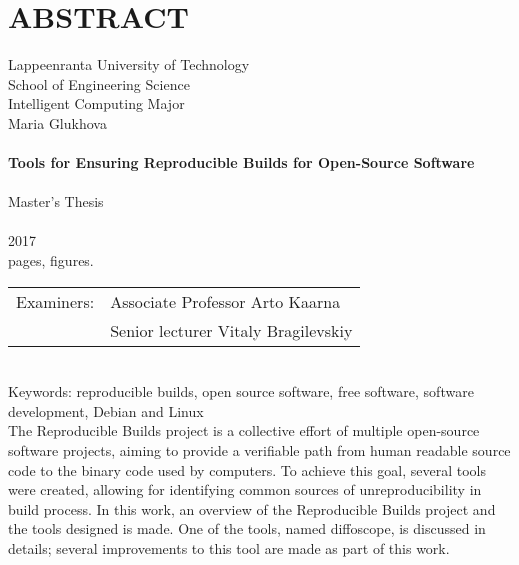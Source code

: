 \section*{ABSTRACT}

Lappeenranta University of Technology\\
School of Engineering Science\\
Intelligent Computing Major\\


Maria Glukhova\\
\\
\textbf{Tools for Ensuring Reproducible Builds for Open-Source Software}\\
\\
Master's Thesis\\
\\
2017\\
\pageref{LastPage} pages, \totalfigures{} figures.\\


\begin{tabular}{l p{11.0cm}}  
  
Examiners: & Associate Professor \foreignlanguage{finnish}{Arto Kaarna}\\
& Senior lecturer Vitaly Bragilevskiy\\

\end {tabular}\\

Keywords: reproducible builds, open source software, free software, software development, Debian and Linux\\


The Reproducible Builds project is a collective effort of multiple open-source software
projects, aiming to provide a verifiable path from human readable source code
to the binary code used by computers. To achieve this goal, several tools were
created, allowing for identifying common sources of unreproducibility in build
process.
In this work, an overview of the Reproducible Builds project and the tools designed is made. One of the tools, named diffoscope, is discussed in details; several improvements to this tool are made as part of this work.\\
